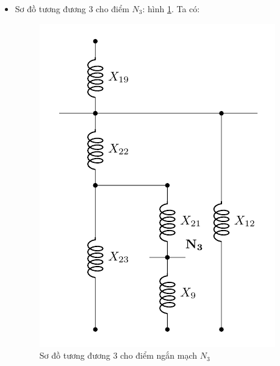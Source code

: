 \documentclass[12pt,a4paper]{article}
\begin{document}
\begin{itemize}
\begin{itemize}
\begin{itemize}
					
					\item Sơ đồ tương đương 3 cho điểm $N_3$: hình \ref{Fig:sodo-tuongduong-bt1-N3-3}. Ta có:
					\begin{figure}[!h]
						\vspace{-.5cm}
						\begin{center}
							\includegraphics[scale=1]{figure-baitap-nganmach-1-N3-3.pdf} 
							\vspace{-.5cm}
						\end{center}
					\caption{Sơ đồ tương đương 3 cho điểm ngắn mạch $N_3$} \label{Fig:sodo-tuongduong-bt1-N3-3}
					\vspace{-.5cm}
					\end{figure}
					

\end{itemize}
\end{itemize}
\end{itemize}
\end{document}
